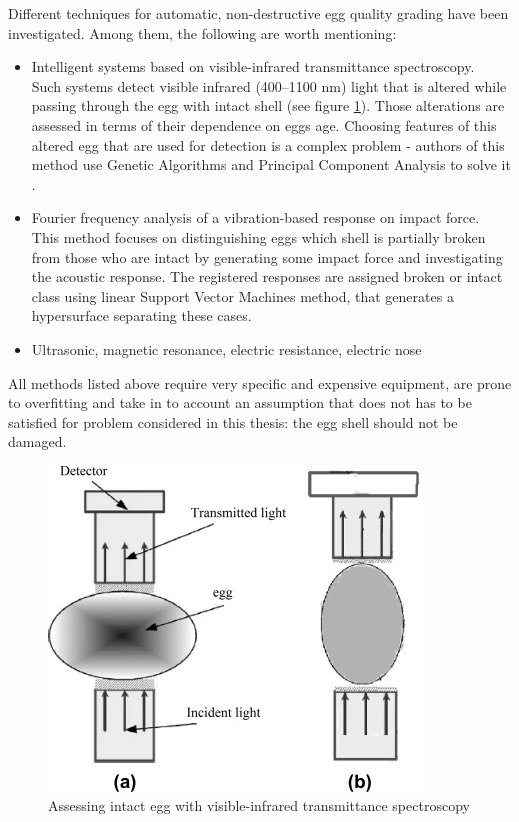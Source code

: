 \documentclass[12pt,twoside,a4paper]{article}
\begin{document}
Different techniques for automatic, non-destructive egg quality grading have been investigated.
Among them, the following are worth mentioning:
\begin{itemize}
\item Intelligent systems based on visible-infrared transmittance spectroscopy.\\
Such systems detect visible infrared (400–1100 nm) light that is altered while passing through the egg with intact shell (see figure \ref{fig:spec}). Those alterations are assessed in terms of their dependence on eggs age. Choosing features of this altered egg that are used for detection is a complex problem - authors of this method use Genetic Algorithms and Principal Component Analysis to solve it \cite{agri}.
\item Fourier frequency analysis of a vibration-based response on impact force. \\ 
This method focuses on distinguishing eggs which shell is partially broken from those who are intact by generating some impact force and investigating the acoustic response.
The registered responses are assigned broken or intact class using linear Support Vector Machines method, that generates a hypersurface separating these cases.\cite{svm} 
\item Ultrasonic, magnetic resonance, electric resistance, electric nose\cite{nondestr}  
\end{itemize}
All methods listed above require very specific and expensive equipment, are prone to overfitting and take in to account an assumption that does not has to be satisfied for problem considered in this thesis: the egg shell should not be damaged.


\begin{figure}[H]
\centering
\includegraphics[width=0.4\paperwidth]{spec}
\caption{Assessing intact egg with visible-infrared transmittance spectroscopy \cite{agri}}\label{fig:spec}
\end{figure}
\end{document}
